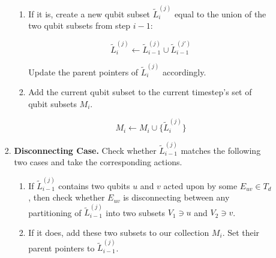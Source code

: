 \begin{enumerate}
\begin{enumerate}
\begin{enumerate}
\begin{enumerate}
\item
If it is, create a new qubit subset
$\tilde{L}^{(j)}_{i}$ equal to the union of the two qubit subsets from
step $i-1$:

\begin{equation*}
\tilde{L}^{(j)}_{i} \leftarrow \tilde{L}^{(j)}_{i-1} \cup \tilde{L}^{(j')}_{i-1}
\end{equation*}

Update the parent pointers of $\tilde{L}^{(j)}_{i}$ accordingly.



\item
Add the current qubit subset to the current timestep's set of qubit subsets $M_i$.

\begin{equation*}
M_i \leftarrow M_i \cup \{ \tilde{L}^{(j)}_{i} \}
\end{equation*}

\end{enumerate}

\item \textbf{Disconnecting Case.} Check whether $\tilde{L}^{(j)}_{i-1}$ matches the following two cases
and take the corresponding actions.

\begin{enumerate}
\item If $\tilde{L}^{(j)}_{i-1}$ contains two qubits $u$ and $v$
acted upon by some
$E_{uv} \in T_d$, then check whether $E_{uv}$ is
disconnecting between any partitioning of $\tilde{L}^{(j)}_{i-1}$ into two
subsets $V_1 \ni u$ and $V_2 \ni v$.

\item
If it does, add these two subsets to our collection $M_i$.
Set their parent pointers to $\tilde{L}^{(j)}_{i-1}$.


\end{enumerate}
\end{enumerate}
\end{enumerate}
\end{enumerate}
